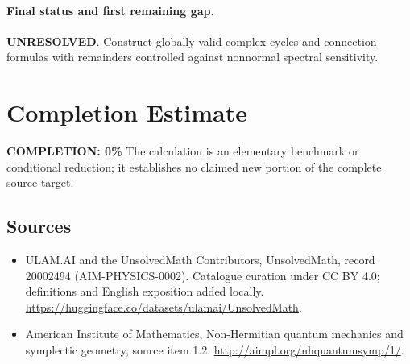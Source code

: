 \documentclass[11pt]{article}
\begin{document}
\paragraph{Final status and first remaining gap.}
\textbf{UNRESOLVED}. Construct globally valid complex cycles and connection formulas with remainders controlled against nonnormal spectral sensitivity.

\section{Completion Estimate}
\noindent\textbf{COMPLETION: 0\%}
The calculation is an elementary benchmark or conditional reduction; it establishes no claimed new portion of the complete source target.

\subsection{Sources}
\begin{itemize}
\item[\hypertarget{source:20002494:1}{S1}] ULAM.AI and the UnsolvedMath Contributors, UnsolvedMath, record 20002494 (AIM-PHYSICS-0002). Catalogue curation under CC BY 4.0; definitions and English exposition added locally.
\url{https://huggingface.co/datasets/ulamai/UnsolvedMath}.
\item[\hypertarget{source:20002494:2}{S2}] American Institute of Mathematics, Non-Hermitian quantum mechanics and symplectic geometry, source item 1.2.
\url{http://aimpl.org/nhquantumsymp/1/}.
\end{itemize}
\label{end:20002494}
\end{document}
